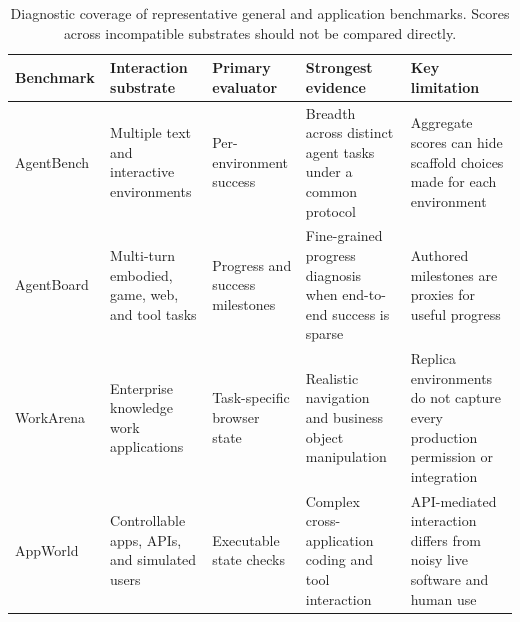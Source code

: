 \begin{table}[!htbp]
\centering
\caption{Diagnostic coverage of representative general and application benchmarks. Scores across incompatible substrates should not be compared directly.}
\label{tab:benchmark-evidence}
\small
\surveytableformat
\begin{tabularx}{\textwidth}{L{2.65cm}L{3.05cm}L{3.1cm}L{3.4cm}Y}
\toprule
{}\textbf{Benchmark} & \textbf{Interaction substrate} & \textbf{Primary evaluator} & \textbf{Strongest evidence} & \textbf{Key limitation} \\
\midrule
AgentBench~\cite{liu2024agentbench} & Multiple text and interactive environments & Per-environment success & Breadth across distinct agent tasks under a common protocol & Aggregate scores can hide scaffold choices made for each environment \\
AgentBoard~\cite{hsieh2024agentboard} & Multi-turn embodied, game, web, and tool tasks & Progress and success milestones & Fine-grained progress diagnosis when end-to-end success is sparse & Authored milestones are proxies for useful progress \\
WorkArena~\cite{drouin2024workarena} & Enterprise knowledge work applications & Task-specific browser state & Realistic navigation and business object manipulation & Replica environments do not capture every production permission or integration \\
AppWorld~\cite{trivedi2024appworld} & Controllable apps, APIs, and simulated users & Executable state checks & Complex cross-application coding and tool interaction & API-mediated interaction differs from noisy live software and human use \\
\bottomrule
\end{tabularx}
\end{table}

